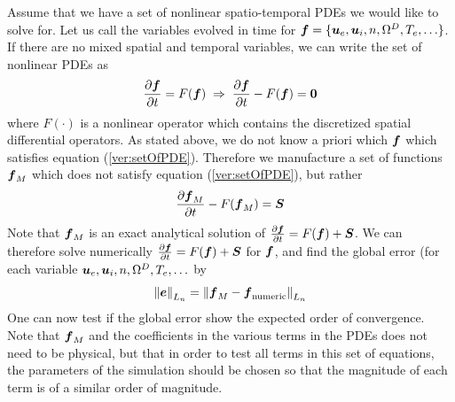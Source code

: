 Assume that we have a set of nonlinear spatio-temporal PDEs we would like to solve for.
Let us call the variables evolved in time for $\boldsymbol{f}=\{\boldsymbol{u}_e, \boldsymbol{u}_i, n, \Omega^D, T_e, \ldots\}$.
If there are no mixed spatial and temporal variables, we can write the set of nonlinear PDEs as
%
\begin{align}
  \frac{\partial {\boldsymbol{f}}}{\partial{t}} = F(\boldsymbol{f}) \; \Rightarrow \; \frac{\partial {\boldsymbol{f}}}{\partial{t}} - F(\boldsymbol{f}) = \boldsymbol{0}
  \label{ver:setOfPDE}
\end{align}
%
where $F(\cdot)$ is a nonlinear operator which contains the discretized spatial differential operators.
As stated above, we do not know a priori which $\boldsymbol{f}$ which satisfies equation (\ref{ver:setOfPDE}).
Therefore we manufacture a set of functions $\boldsymbol{f}_M$ which does not satisfy equation (\ref{ver:setOfPDE}), but rather
%
\begin{align*}
    \frac{\partial {\boldsymbol{f}_M}}{\partial{t}} - F(\boldsymbol{f}_M) = \boldsymbol{S}
\end{align*}
%
Note that $\boldsymbol{f}_M$ is an exact analytical solution of $\frac{\partial {\boldsymbol{f}}}{\partial{t}} = F(\boldsymbol{f}) + \boldsymbol{S}$.
We can therefore solve numerically $\frac{\partial {\boldsymbol{f}}}{\partial{t}} = F(\boldsymbol{f}) + \boldsymbol{S}$ for $\boldsymbol{f}$, and find the global error (for each variable $\boldsymbol{u}_e, \boldsymbol{u}_i, n, \Omega^D, T_e, \ldots$ by
%
\begin{align*}
    \left\|\boldsymbol{e}\right\|_{L_n} =
    \left\|\boldsymbol{f}_{M} - \boldsymbol{f}_{\text{numeric}}\right\|_{L_n}
\end{align*}
%
One can now test if the global error show the expected order of convergence.
Note that $\boldsymbol{f}_M$ and the coefficients in the various terms in the PDEs does not need to be physical, but that in order to test all terms in this set of equations, the parameters of the simulation should be chosen so that the magnitude of each term is of a similar order of magnitude.

